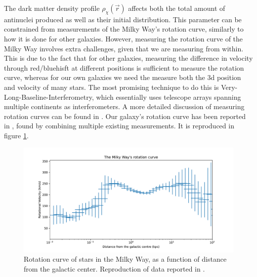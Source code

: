 The dark matter density profile $\rho_\chi(\vec{r})$ affects both the total amount of antinuclei produced as well as their initial distribution. This parameter can be constrained from measurements of the Milky Way's rotation curve, similarly to how it is done for other galaxies. However, measuring the rotation curve of the Milky Way involves extra challenges, given that we are measuring from within. This is due to the fact that for other galaxies, measuring the difference in velocity through red/bluehisft at different positions is sufficient to measure the rotation curve, whereas for our own galaxies we need the measure both the 3d position and velocity of many stars. The most promising technique to do this is Very-Long-Baseline-Interferometry, which essentially uses telescope arrays spanning multiple continents as interferometers\cite{}. A more detailed discussion of measuring rotation curves can be found in \cite{Sofue_2016, Sofue2020}. Our galaxy's rotation curve  has been reported in \cite{Sofue2020}, found by combining multiple existing measurements. It is reproduced in figure \ref{fig:MilkyWayRotationCurve}. \\

\begin{figure}[hbtp]
    \centering
    \includegraphics[width=\textwidth]{figures/RotationCurveMilkyWay.pdf}
    \caption{Rotation curve of stars in the Milky Way, as a function of distance from the galactic center. Reproduction of data reported in \cite{Sofue2020}.}
    \label{fig:MilkyWayRotationCurve}
\end{figure}


